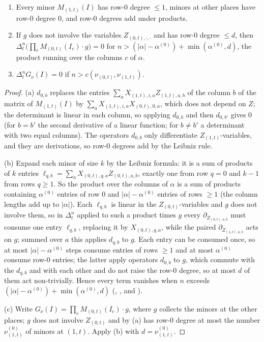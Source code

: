 \begin{lemma}\label{pf:top-shape:lap}
\begin{enumerate}[label=(\alph*)]
\item Every minor $M_{(1,t)}(I)$ has row-$0$ degree $\le1$, minors at other places have row-$0$ degree $0$, and row-$0$
degrees add under products.
\item If $g$ does not involve the variables $Z_{(0,t),\cdot,\cdot}$ and has row-$0$ degree $\le d$, then
$\Delta_t^n\bigl(\prod_cM_{(0,t)}(I_c)\cdot g\bigr)=0$ for $n>(|\alpha|-\alpha^{(0)})+\min(\alpha^{(0)},d)$, the product running
over the columns $c$ of $\alpha$.
\item $\Delta_t^nG_\nu(I)=0$ if $n>c(\nu_{(0,t)},\nu_{(1,t)})$.
\end{enumerate}
\end{lemma}

\begin{proof}
(a) $d_{0,b}$ replaces the entries $\sum_aX_{(1,t),i,a}Z_{(1,t),a,b}$ of the column $b$ of the matrix of $M_{(1,t)}(I)$ by
$\sum_aX_{(1,t),i,a}X_{(0,t),0,a}$, which does not depend on $Z$; the determinant is linear in each column, so applying
$d_{0,b}$ and then $d_{0,b'}$ gives $0$ (for $b=b'$ the second derivative of a linear function; for $b\ne b'$ a
determinant with two equal columns). The operators $d_{0,b}$ only differentiate $Z_{(1,t)}$-variables, and they are
derivations, so row-$0$ degrees add by the Leibniz rule.

(b) Expand each minor of size $k$ by the Leibniz formula: it is a sum of products of $k$ entries
$\ell_{q,b}=\sum_aX_{(0,t),q,a}Z_{(0,t),a,b}$, exactly one from row $q=0$ and $k-1$ from rows $q\ge1$. So the product over the
columns of $\alpha$ is a sum of products containing $\alpha^{(0)}$ entries of row $0$ and $|\alpha|-\alpha^{(0)}$ entries of
rows $\ge1$ (the column lengths add up to $|\alpha|$). Each $\ell_{q,b}$ is linear in the $Z_{(0,t)}$-variables and $g$ does
not involve them, so in $\Delta_t^n$ applied to such a product times $g$ every $\partial_{Z_{(0,t),a,b}}$ must consume one
entry $\ell_{q,b}$, replacing it by $X_{(0,t),q,a}$, while the paired $\partial_{Z_{(1,t),a,b}}$ acts on $g$; summed over
$a$ this applies $d_{q,b}$ to $g$. Each entry can be consumed once, so at most $|\alpha|-\alpha^{(0)}$ steps consume
entries of rows $\ge1$ and at most $\alpha^{(0)}$ consume row-$0$ entries; the latter apply operators $d_{0,b}$ to $g$, which
commute with the $d_{q,b}$ and with each other and do not raise the row-$0$ degree, so at most $d$ of them act
non-trivially. Hence every term vanishes when $n$ exceeds $(|\alpha|-\alpha^{(0)})+\min(\alpha^{(0)},d)$
(, , and ).

(c) Write $G_\nu(I)=\prod_cM_{(0,t)}(I_c)\cdot g$, where $g$ collects the minors at the other places; $g$ does not involve
$Z_{(0,t)}$ and by (a) has row-$0$ degree at most the number $\nu^{(0)}_{(1,t)}$ of minors at $(1,t)$. Apply (b) with
$d=\nu^{(0)}_{(1,t)}$.
\end{proof}

